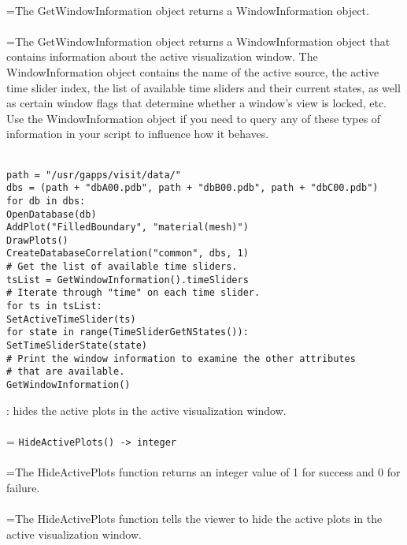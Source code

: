 \documentclass[10pt,a4paper]{report}
\begin{document}
 \\ 
\hangindent=\parindent The GetWindowInformation object returns a WindowInformation object. \\[-3mm] 

 \\ 
\hangindent=\parindent The GetWindowInformation object returns a WindowInformation object that contains information about the active visualization window. The WindowInformation object contains the name of the active source, the active time slider index, the list of available time sliders and their current states, as well as certain window flags that determine whether a window's view is locked, etc. Use the WindowInformation object if you need to query any of these types of information in your script to influence how it behaves. \\[-3mm] 

\\[-6mm]
\begin{verbatim}path = "/usr/gapps/visit/data/"
dbs = (path + "dbA00.pdb", path + "dbB00.pdb", path + "dbC00.pdb")
for db in dbs:
OpenDatabase(db)
AddPlot("FilledBoundary", "material(mesh)")
DrawPlots()
CreateDatabaseCorrelation("common", dbs, 1)
# Get the list of available time sliders.
tsList = GetWindowInformation().timeSliders
# Iterate through "time" on each time slider.
for ts in tsList:
SetActiveTimeSlider(ts)
for state in range(TimeSliderGetNStates()):
SetTimeSliderState(state)
# Print the window information to examine the other attributes
# that are available.
GetWindowInformation()
\end{verbatim}
\newpage


{}
: hides the active plots in the active visualization window.\\[-3mm]

 \\ 
\hangindent=\parindent 
\verb!HideActivePlots() -> integer!\\ [-3mm]

 \\ 
\hangindent=\parindent The HideActivePlots function returns an integer value of 1 for success and 0 for failure. \\[-3mm] 

 \\ 
\hangindent=\parindent The HideActivePlots function tells the viewer to hide the active plots in the active visualization window. \\[-3mm] 
\end{document}
